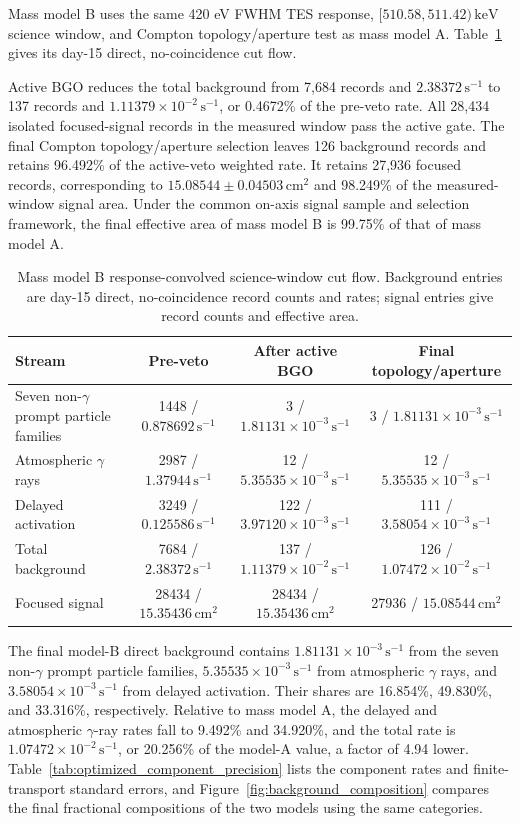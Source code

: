 \documentclass[11pt]{article}
\newcommand{\revblue}[1]{\textcolor{revisionblue}{#1}}
\newcommand{\keV}{\ensuremath{\,\mathrm{keV}}}
\newcommand{\cps}{\ensuremath{\,\mathrm{s^{-1}}}}
\begin{document}
Mass model B uses the same 420 eV FWHM TES response, $[510.58,511.42)\keV$ science window, and Compton topology/aperture test as mass model A. Table~\ref{tab:optimized_cutflow} gives its day-15 direct, no-coincidence cut flow.

Active BGO reduces the total background from 7,684 records and $2.38372\cps$ to 137 records and $1.11379\times10^{-2}\cps$, or 0.4672\% of the pre-veto rate. All 28,434 isolated focused-signal records in the measured window pass the active gate. The final Compton topology/aperture selection leaves 126 background records and retains 96.492\% of the active-veto weighted rate. It retains 27,936 focused records, corresponding to $15.08544\pm0.04503\,\mathrm{cm^2}$ and 98.249\% of the measured-window signal area. \revblue{Under the common on-axis signal sample and selection framework, the final effective area of mass model B is 99.75\% of that of mass model A.}

\begin{table}[H]
\centering
\caption{Mass model B response-convolved science-window cut flow. Background entries are day-15 direct, no-coincidence record counts and rates; signal entries give record counts and effective area.}
\label{tab:optimized_cutflow}
\footnotesize
\begin{tabular}{lccc}
\toprule
Stream & Pre-veto & After active BGO & Final topology/aperture \\
\midrule
\revblue{Seven non-$\gamma$ prompt particle families} & 1448 / $0.878692\cps$ & 3 / $1.81131\times10^{-3}\cps$ & 3 / $1.81131\times10^{-3}\cps$ \\
\revblue{Atmospheric $\gamma$ rays} & 2987 / $1.37944\cps$ & 12 / $5.35535\times10^{-3}\cps$ & 12 / $5.35535\times10^{-3}\cps$ \\
Delayed activation & 3249 / $0.125586\cps$ & 122 / $3.97120\times10^{-3}\cps$ & 111 / $3.58054\times10^{-3}\cps$ \\
Total background & 7684 / $2.38372\cps$ & 137 / $1.11379\times10^{-2}\cps$ & 126 / $1.07472\times10^{-2}\cps$ \\
Focused signal & 28434 / $15.35436\,\mathrm{cm^2}$ & 28434 / $15.35436\,\mathrm{cm^2}$ & 27936 / $15.08544\,\mathrm{cm^2}$ \\
\bottomrule
\end{tabular}
\end{table}

The final model-B direct background contains $1.81131\times10^{-3}\cps$ from
the \revblue{seven non-$\gamma$ prompt particle families}, $5.35535\times10^{-3}\cps$ from \revblue{atmospheric
$\gamma$ rays}, and $3.58054\times10^{-3}\cps$ from delayed
activation. Their shares are 16.854\%, 49.830\%, and 33.316\%, respectively.
Relative to mass model A, the delayed and \revblue{atmospheric $\gamma$-ray rates} fall to
9.492\% and 34.920\%, and the total rate is $1.07472\times10^{-2}\cps$, or
20.256\% of the model-A value, a factor of 4.94 lower. \revblue{Table~\ref{tab:optimized_component_precision}
lists the component rates and finite-transport standard errors, and
Figure~\ref{fig:background_composition} compares the final fractional
compositions of the two models using the same categories.}
\end{document}
